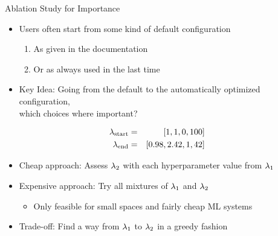 \begin{frame}[c]{Ablation Study for Importance}

\begin{itemize}
	\item Users often start from some kind of default configuration
	\begin{enumerate}
		\item As given in the documentation 
		\item Or as always used in the last time
	\end{enumerate}
	\item \alert{Key Idea}: Going from the default to the automatically optimized configuration,\\
	 which choices where important?
\end{itemize}

\begin{eqnarray}
\mathbf{\lambda}_{\text{start}} &=& [1, 1, 0, 100]  \nonumber\\
\mathbf{\lambda}_{\text{end}} &=& [0.98, 2.42, 1, 42]  \nonumber
\end{eqnarray}

\begin{itemize}
	\item Cheap approach: Assess $\mathbf{\lambda}_2$ with each hyperparameter value from $\mathbf{\lambda}_1$
	\pause
	\item Expensive approach: Try all mixtures of $\mathbf{\lambda}_1$ and $\mathbf{\lambda}_2$
	\begin{itemize}
		\item  Only feasible for small spaces and fairly cheap ML systems
	\end{itemize}
	\pause
	\item Trade-off: Find a way from $\mathbf{\lambda}_1$ to $\mathbf{\lambda}_2$ in a greedy fashion 
\end{itemize}

\end{frame}
